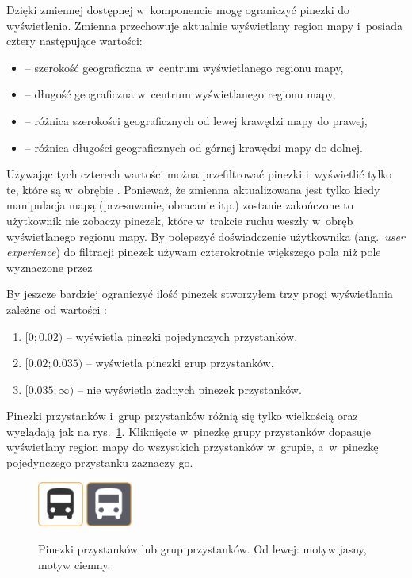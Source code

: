 \documentclass{SGGW-thesis}
\begin{document}
Dzięki zmiennej  dostępnej w~komponencie  mogę ograniczyć pinezki do wyświetlenia.
Zmienna  przechowuje aktualnie wyświetlany region mapy i~posiada cztery następujące wartości:
\begin{itemize}
  \item{ -- szerokość geograficzna w~centrum wyświetlanego regionu mapy,}
  \item{ -- długość geograficzna w~centrum wyświetlanego regionu mapy,}
  \item{ -- różnica szerokości geograficznych od lewej krawędzi mapy do prawej,}
  \item{ -- różnica długości geograficznych od górnej krawędzi mapy do dolnej.}
\end{itemize}
Używając tych czterech wartości można przefiltrować pinezki i~wyświetlić tylko te, które są w~obrębie .
Ponieważ, że zmienna  aktualizowana jest tylko kiedy manipulacja mapą (przesuwanie, obracanie itp.) zostanie zakończone to użytkownik nie zobaczy pinezek,
które w~trakcie ruchu weszły w~obręb wyświetlanego regionu mapy.
By polepszyć doświadczenie użytkownika (ang.~\textit{user experience}) do filtracji pinezek używam czterokrotnie większego pola niż pole wyznaczone przez 

By jeszcze bardziej ograniczyć ilość pinezek stworzyłem trzy progi wyświetlania zależne od wartości :
\begin{enumerate}
  \item{$[0;0.02)$ -- wyświetla pinezki pojedynczych przystanków,}
  \item{$[0.02; 0.035)$ -- wyświetla pinezki grup przystanków,}
  \item{$[0.035;\infty)$ -- nie wyświetla żadnych pinezek przystanków.}
\end{enumerate}


Pinezki przystanków i~grup przystanków różnią się tylko wielkością oraz wyglądają jak na rys.~\ref{screen.pin_przystanki}.
Kliknięcie w~pinezkę grupy przystanków dopasuje wyświetlany region mapy do wszystkich przystanków w~grupie,
a~w~pinezkę pojedynczego przystanku zaznaczy go.
\begin{figure}
  \centering
  \includegraphics[width=15mm]{screeny/busstop_jasny}
  \enspace\enspace
  \includegraphics[width=15mm]{screeny/busstop_ciemny}
  \caption[Pinezki przystanków]{
    \label{screen.pin_przystanki}
    Pinezki przystanków lub grup przystanków. Od lewej: motyw jasny, motyw ciemny. \vspace{2ex}
  }
\end{figure}
\end{document}

